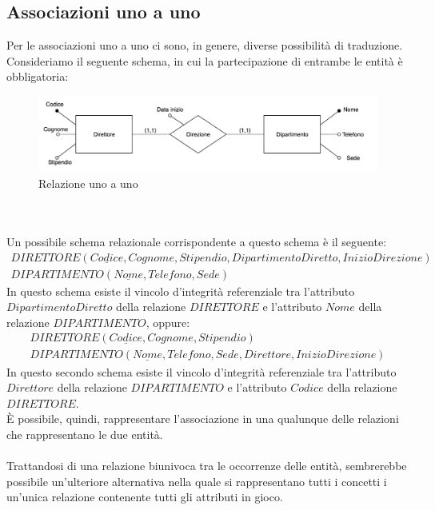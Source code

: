 \subsection{Associazioni uno a uno}
Per le associazioni uno a uno ci sono, in genere, diverse possibilità di traduzione.\\
Consideriamo il seguente schema, in cui la partecipazione di entrambe le entità è obbligatoria:
    \begin{figure}[h!]
        \centering
        \includegraphics[scale = 0.5]{15/img10}
        \caption{Relazione uno a uno}
    \end{figure}\\\\
Un possibile schema relazionale corrispondente a questo schema è il seguente:
    \begin{equation}\begin{aligned}
        DIRETTORE(\underline{Codice}, Cognome, Stipendio, DipartimentoDiretto, InizioDirezione)\\
        DIPARTIMENTO(\underline{Nome}, Telefono, Sede)
    \end{aligned}\end{equation}
In questo schema esiste il vincolo d'integrità referenziale tra l'attributo $DipartimentoDiretto$ della relazione $DIRETTORE$ e l'attributo $Nome$ della relazione $DIPARTIMENTO$, oppure:
    \begin{equation}\begin{aligned}
        DIRETTORE(\underline{Codice}, Cognome, Stipendio)\\
        DIPARTIMENTO(\underline{Nome}, Telefono, Sede, Direttore, InizioDirezione)
    \end{aligned}\end{equation}
In questo secondo schema esiste il vincolo d'integrità referenziale tra l'attributo $Direttore$ della relazione $DIPARTIMENTO$ e l'attributo $Codice$ della relazione $DIRETTORE$.\\
È possibile, quindi, rappresentare l'associazione in una qualunque delle relazioni che rappresentano le due entità.\\\\
Trattandosi di una relazione biunivoca tra le occorrenze delle entità, sembrerebbe possibile un'ulteriore alternativa nella quale si rappresentano tutti i concetti i un'unica relazione contenente tutti gli attributi in gioco.\\
